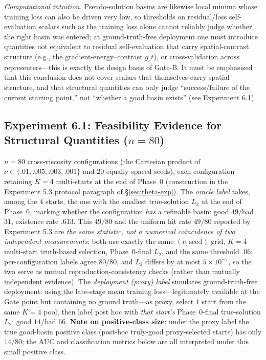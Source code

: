 \documentclass[11pt]{article}
\numberwithin{equation}{section}
\begin{document}
\noindent\emph{Computational intuition.} Pseudo-solution basins are likewise local minima whose training loss can also be driven very low, so thresholds on residual/loss self-evaluation scalars such as the training loss alone cannot reliably judge whether the right basin was entered; at ground-truth-free deployment one must introduce quantities not equivalent to residual self-evaluation that carry spatial-contrast structure (e.g., the gradient-energy--contrast $g_et$), or cross-validation across representers---this is exactly the design basis of Gate-B. It must be emphasized that this conclusion does not cover scalars that themselves carry spatial structure, and that structural quantities can only judge ``success/failure of the current starting point,'' not ``whether a good basin exists'' (see Experiment 6.1).

\subsection{Experiment 6.1: Feasibility Evidence for Structural Quantities ($n=80$)}\label{sec:g2}

$n=80$ cross-viscosity configurations (the Cartesian product of $\nu\in\{.01,.005,.003,.001\}$ and $20$ equally spaced seeds), each configuration retaining $K=4$ multi-starts at the end of Phase~0 (construction in the Experiment 5.3 protocol paragraph of \S\ref{sec:theta-exp}). The \emph{oracle label} takes, among the $4$ starts, the one with the smallest true-solution $L_2$ at the end of Phase~0, marking whether the configuration \emph{has} a refinable basin: good $49$/bad $31$, existence rate $.613$. This $49/80$ and the uniform hit rate $49/80$ reported by Experiment 5.3 are \emph{the same statistic, not a numerical coincidence of two independent measurements}: both use exactly the same $(\nu,\text{seed})$ grid, $K=4$ multi-start truth-based selection, Phase~0-final $L_2$, and the same threshold $.06$; per-configuration labels agree $80/80$, and $L_2$ differs by at most $5\times10^{-7}$, so the two serve as mutual reproduction-consistency checks (rather than mutually independent evidence). The \emph{deployment (proxy) label} simulates ground-truth-free deployment: using the late-stage mean training loss---legitimately available at the Gate point but containing no ground truth---as proxy, select $1$ start from the same $K=4$ pool, then label post hoc with \emph{that start's} Phase~0-final true-solution $L_2$: good $14$/bad $66$. \textbf{Note on positive-class size}: under the proxy label the true good-basin positive class (post-hoc truly-good proxy-selected starts) has only $14/80$; the AUC and classification metrics below are all interpreted under this small positive class.
\end{document}
